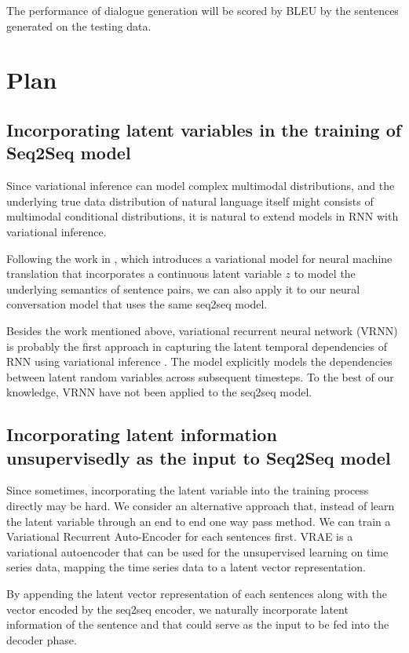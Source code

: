 \documentclass{article}
\begin{document}
The performance of dialogue generation will be scored by BLEU by the sentences generated on the testing data. 
 

\section{Plan}

\subsection{Incorporating latent variables in the training of Seq2Seq model}
Since variational inference can model complex multimodal distributions, and the underlying true data distribution of natural language itself might consists of multimodal conditional distributions, it is natural to extend models in RNN with variational inference.

Following the work in \cite{vnmt}, which introduces a variational model for neural machine translation that incorporates a continuous latent variable $z$ to model the underlying semantics of sentence pairs, we can also apply it to our neural conversation model that uses the same seq2seq model. 

Besides the work mentioned above, variational recurrent neural network (VRNN) is probably the first approach in capturing the latent temporal dependencies of RNN using variational inference \cite{vrnn}. The model explicitly models the dependencies between latent random variables across subsequent timesteps. To the best of our knowledge, VRNN have not been applied to the seq2seq model.

\subsection{Incorporating latent information unsupervisedly as the input to Seq2Seq model}
Since sometimes, incorporating the latent variable into the training process directly may be hard. We consider an alternative approach that, instead of learn the latent variable through an end to end one way pass method. We can train a Variational Recurrent Auto-Encoder \cite{vrae} for each sentences first. VRAE is a variational autoencoder that can be used for the unsupervised learning on time series data, mapping the time series data to a latent vector representation. 

By appending the latent vector representation of each sentences along with the vector encoded by the seq2seq encoder, we naturally incorporate latent information of the sentence and that could serve as the input to be fed into the decoder phase.
\end{document}
